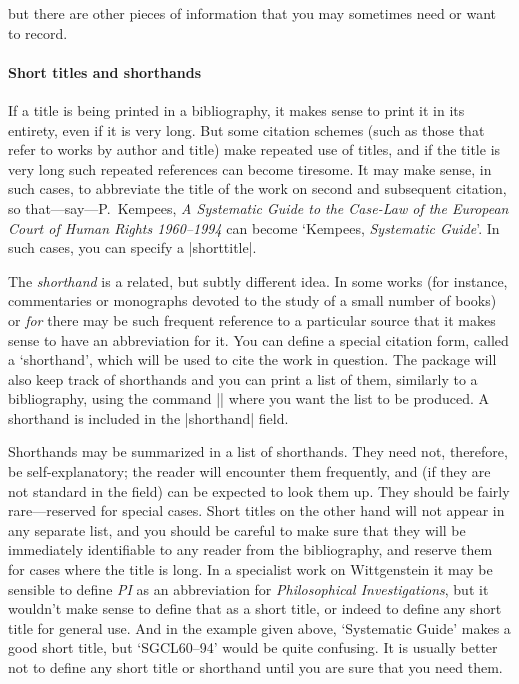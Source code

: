 { but there are other pieces of information
that you may sometimes need or want to record.

\paragraph{Short titles and shorthands} If a title is being printed in
a bibliography, it makes sense to print it in its entirety, even if it
is very long. But some citation schemes (such as those that refer to
works by author and title) make repeated use of titles, and if the
title is very long such repeated references can become tiresome. It
may make sense, in such cases, to abbreviate the title of the work on
second and subsequent citation, so that---say---P.\ Kempees, \emph{A
  Systematic Guide to the Case-Law of the European Court of Human
  Rights 1960--1994} can become `Kempees, \emph{Systematic Guide}'. In
such cases, you can specify a |shorttitle|.

The \emph{shorthand} is a related, but subtly different idea. In some
works (for instance, commentaries or monographs devoted to the study
of a small number of books) or \emph{for} there may be such frequent
reference to a particular source that it makes sense to have an
abbreviation for it. You can define a special citation form, called a
`shorthand', which will be used to cite the work in question. The
package will also keep track of shorthands and you can print a list of
them, similarly to a bibliography, using the command
|\printshorthands| where you want the list to be produced. A shorthand is included in the
|shorthand| field.

Shorthands may be summarized in a list of shorthands. They need not,
therefore, be self-explanatory; the reader will encounter them
frequently, and (if they are not standard in the field) can be
expected to look them up. They should be fairly rare---reserved for
special cases. Short titles on the other hand will not appear in any
separate list, and you should be careful to make sure that they will
be immediately identifiable to any reader from the bibliography, and
reserve them for cases where the title is long. In a specialist work
on Wittgenstein it may be sensible to define \emph{PI} as an
abbreviation for \emph{Philosophical Investigations}, but it wouldn't
make sense to define that as a short title, or indeed to define any
short title for general use. And in the example given above,
`Systematic Guide' makes a good short title, but `SGCL60--94' would be
quite confusing. It is usually better not to define any short title or
shorthand until you are sure that you need them.

}

